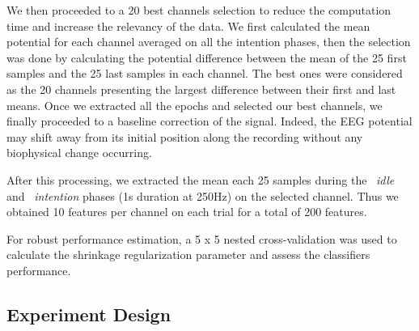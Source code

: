 We then proceeded to a 20 best channels selection to reduce the computation time and increase the relevancy of the data. We first calculated the mean potential for each channel averaged on all the intention phases, then the selection was done by calculating the potential difference between the mean of the 25 first samples and the 25 last samples in each channel. The best ones were considered as the 20 channels presenting the largest difference between their first and last means.
Once we extracted all the epochs and selected our best channels, we finally proceeded to a baseline correction of the signal. Indeed, the EEG potential may shift away from its initial position along the recording without any biophysical change occurring.

After this processing, we extracted the mean each 25 samples during the ~\textit{idle} and ~\textit{intention} phases (1s duration at 250Hz) on the selected channel. Thus we obtained 10 features per channel on each trial for a total of 200 features.

For robust performance estimation, a 5 x 5 nested cross-validation was used to calculate the shrinkage regularization parameter and assess the classifiers performance.

\subsection{Experiment Design}

